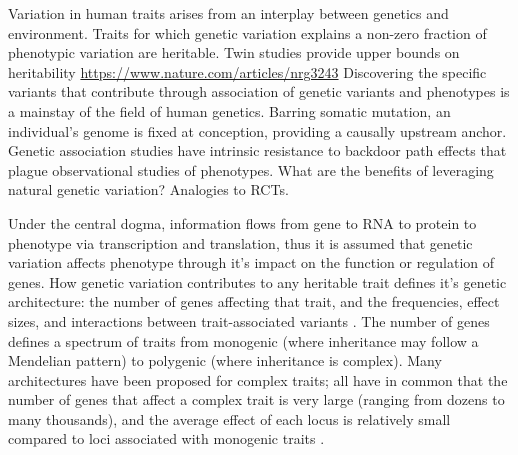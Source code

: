 \begin{outline}
\1 Variation in human traits arises from an interplay between genetics and environment.
Traits for which genetic variation explains a non-zero fraction of phenotypic variation are heritable.
    \2 Twin studies provide upper bounds on heritability \url{https://www.nature.com/articles/nrg3243}
\1 Discovering the specific variants that contribute through association of genetic variants and phenotypes is a mainstay of the field of human genetics.
Barring somatic mutation, an individual's genome is fixed at conception, providing a causally upstream anchor.
Genetic association studies have intrinsic resistance to backdoor path effects that plague observational studies of phenotypes.
    \2 What are the benefits of leveraging natural genetic variation? Analogies to RCTs.

\1 Under the central dogma, information flows from gene to RNA to protein to phenotype via transcription and translation, thus it is assumed that genetic variation affects phenotype through it's impact on the function or regulation of genes.
How genetic variation contributes to any heritable trait defines it's genetic architecture: the number of genes affecting that trait, and the frequencies, effect sizes, and interactions between trait-associated variants \autocite{visscher2019Fisher1918Paper}.
The number of genes defines a spectrum of traits from monogenic (where inheritance may follow a Mendelian pattern) to polygenic (where inheritance is complex).
Many architectures have been proposed for complex traits; all have in common that the number of genes that affect a complex trait is very large (ranging from dozens to many thousands),
and the average effect of each locus is relatively small compared to loci associated with monogenic traits \autocite{gibson2011RareCommonVariants,boyle2017ExpandedViewComplex}.


\end{outline}
